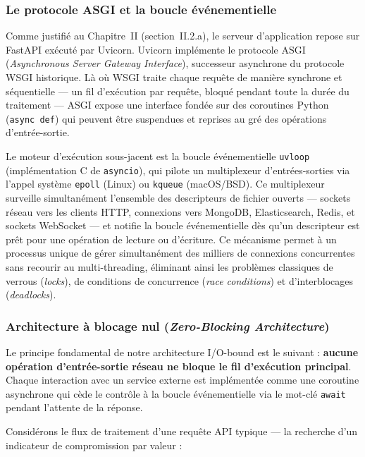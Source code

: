 \subsubsection{Le protocole ASGI et la boucle événementielle}

Comme justifié au Chapitre~II (section~II.2.a), le serveur d'application repose sur FastAPI exécuté par Uvicorn. Uvicorn implémente le protocole ASGI (\textit{Asynchronous Server Gateway Interface}), successeur asynchrone du protocole WSGI historique. Là où WSGI traite chaque requête de manière synchrone et séquentielle --- un fil d'exécution par requête, bloqué pendant toute la durée du traitement --- ASGI expose une interface fondée sur des coroutines Python (\texttt{async def}) qui peuvent être suspendues et reprises au gré des opérations d'entrée-sortie.

Le moteur d'exécution sous-jacent est la boucle événementielle \texttt{uvloop} (implémentation C de \texttt{asyncio}), qui pilote un multiplexeur d'entrées-sorties via l'appel système \texttt{epoll} (Linux) ou \texttt{kqueue} (macOS/BSD). Ce multiplexeur surveille simultanément l'ensemble des descripteurs de fichier ouverts --- sockets réseau vers les clients HTTP, connexions vers MongoDB, Elasticsearch, Redis, et sockets WebSocket --- et notifie la boucle événementielle dès qu'un descripteur est prêt pour une opération de lecture ou d'écriture. Ce mécanisme permet à un processus unique de gérer simultanément des milliers de connexions concurrentes sans recourir au multi-threading, éliminant ainsi les problèmes classiques de verrous (\textit{locks}), de conditions de concurrence (\textit{race conditions}) et d'interblocages (\textit{deadlocks}).

\subsubsection{Architecture à blocage nul (\textit{Zero-Blocking Architecture})}

Le principe fondamental de notre architecture I/O-bound est le suivant : \textbf{aucune opération d'entrée-sortie réseau ne bloque le fil d'exécution principal}. Chaque interaction avec un service externe est implémentée comme une coroutine asynchrone qui cède le contrôle à la boucle événementielle via le mot-clé \texttt{await} pendant l'attente de la réponse.

Considérons le flux de traitement d'une requête API typique --- la recherche d'un indicateur de compromission par valeur :

